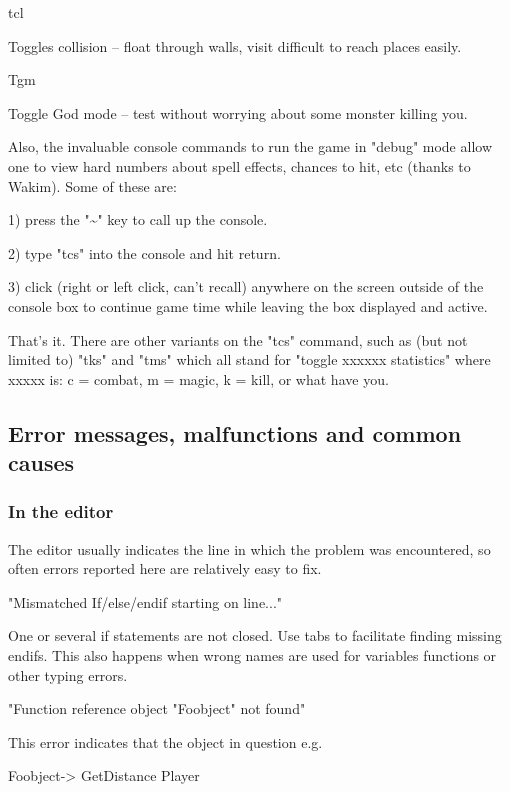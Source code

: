 tcl

Toggles collision -- float through walls, visit difficult to reach
places easily.

Tgm

Toggle God mode -- test without worrying about some monster killing you.

Also, the invaluable console commands to run the game in "debug" mode
allow one to view hard numbers about spell effects, chances to hit, etc
(thanks to Wakim). Some of these are:

1) press the "\textasciitilde" key to call up the console.

2) type "tcs" into the console and hit return.

3) click (right or left click, can't recall) anywhere on the screen
outside of the console box to continue game time while leaving the box
displayed and active.

That's it. There are other variants on the "tcs" command, such as (but
not limited to) "tks" and "tms" which all stand for "toggle xxxxxx
statistics" where xxxxx is: c = combat, m = magic, k = kill, or what
have you.

\hypertarget{error-messages-malfunctions-and-common-causes}{%
\subsection{Error messages, malfunctions and common
causes}\label{error-messages-malfunctions-and-common-causes}}

\hypertarget{in-the-editor}{%
\subsubsection{In the editor}\label{in-the-editor}}

The editor usually indicates the line in which the problem was
encountered, so often errors reported here are relatively easy to fix.

"Mismatched If/else/endif starting on line..."

One or several if statements are not closed. Use tabs to facilitate
finding missing endifs. This also happens when wrong names are used for
variables functions or other typing errors.

"Function reference object "Foobject" not found"

This error indicates that the object in question e.g.

Foobject-> GetDistance Player


